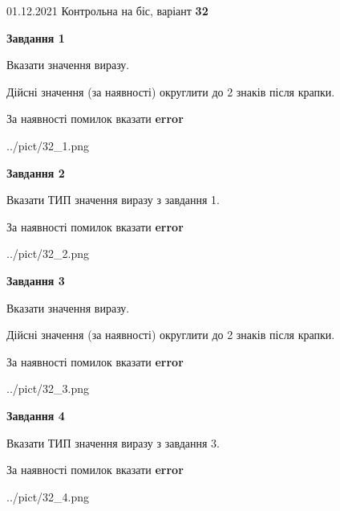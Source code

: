\documentclass[11pt, ukrainian]{article}
\begin{document}
{01.12.2021 Контрольна на біс, варіант  \No \textbf { 32 }\par}
{
\begin {large}
{\begin {center}\textbf{Завдання 1}\end {center}}\par
Вказати значення виразу. \par
Дійсні значення (за наявності) округлити до 2 знаків після крапки. \par
За наявності помилок вказати \textbf{error}

\begin{center}
	{../pict/32_1.png}
\end{center}
\newpage

{\begin {center}\textbf{Завдання 2}\end {center}}\par
Вказати ТИП значення виразу з завдання 1. \par
За наявності помилок вказати \textbf{error}

\begin{center}
	{../pict/32_2.png}
\end{center}
\newpage

{\begin {center}\textbf{Завдання 3}\end {center}}\par
Вказати значення виразу. \par
Дійсні значення (за наявності) округлити до 2 знаків після крапки. \par
За наявності помилок вказати \textbf{error}

\begin{center}
	{../pict/32_3.png}
\end{center}
\newpage

{\begin {center}\textbf{Завдання 4}\end {center}}\par
Вказати ТИП значення виразу з завдання 3. \par
За наявності помилок вказати \textbf{error}

\begin{center}
	{../pict/32_4.png}
\end{center}
\newpage


\end{large}}
\end{document}
